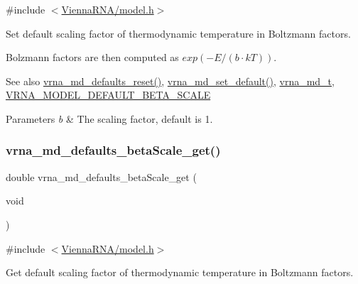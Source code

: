{\ttfamily \#include $<$\hyperlink{model_8h}{Vienna\+R\+N\+A/model.\+h}$>$}



Set default scaling factor of thermodynamic temperature in Boltzmann factors. 

Bolzmann factors are then computed as $ exp(-E / (b \cdot kT))$. \begin{DoxySeeAlso}{See also}
\hyperlink{group__model__details_ga70834424cf804d149937de89f80ceb45}{vrna\+\_\+md\+\_\+defaults\+\_\+reset()}, \hyperlink{group__model__details_ga8ac6ff84936282436f822644bf841f66}{vrna\+\_\+md\+\_\+set\+\_\+default()}, \hyperlink{group__model__details_ga1f8a10e12a0a1915f2a4eff0b28ea17c}{vrna\+\_\+md\+\_\+t}, \hyperlink{group__model__details_ga383d3ac8d08c3b6221754b50871c1200}{V\+R\+N\+A\+\_\+\+M\+O\+D\+E\+L\+\_\+\+D\+E\+F\+A\+U\+L\+T\+\_\+\+B\+E\+T\+A\+\_\+\+S\+C\+A\+LE} 
\end{DoxySeeAlso}

\begin{DoxyParams}{Parameters}
{\em b} & The scaling factor, default is 1. \\
\hline
\end{DoxyParams}
\mbox{\label{group__model__details_gabb8780f5410c52f970d75b044059bd09}} 
\subsubsection{\texorpdfstring{vrna\+\_\+md\+\_\+defaults\+\_\+beta\+Scale\+\_\+get()}{vrna\_md\_defaults\_betaScale\_get()}}
{\footnotesize\ttfamily double vrna\+\_\+md\+\_\+defaults\+\_\+beta\+Scale\+\_\+get (\begin{DoxyParamCaption}\item[{void}]{ }\end{DoxyParamCaption})}



{\ttfamily \#include $<$\hyperlink{model_8h}{Vienna\+R\+N\+A/model.\+h}$>$}



Get default scaling factor of thermodynamic temperature in Boltzmann factors. 

